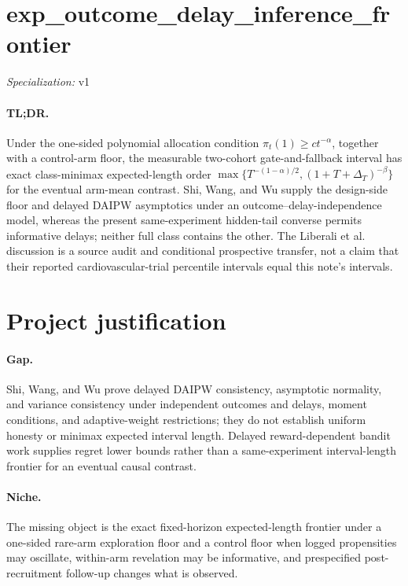 \documentclass{article}
\begin{document}
\sloppy

\section*{exp\_\allowbreak{}outcome\_\allowbreak{}delay\_\allowbreak{}inference\_\allowbreak{}frontier}

\noindent\textit{Specialization:} v1\par

\paragraph{TL;DR.} Under the one-sided polynomial allocation condition \(\pi_t(1)\geq ct^{-\alpha}\), together with a control-arm floor, the measurable two-cohort gate-and-fallback interval has exact class-minimax expected-length order \(\max\{T^{-(1-\alpha)/2},(1+T+\Delta_T)^{-\beta}\}\) for the eventual arm-mean contrast. Shi, Wang, and Wu supply the design-side floor and delayed DAIPW asymptotics under an outcome--delay-independence model, whereas the present same-experiment hidden-tail converse permits informative delays; neither full class contains the other. The Liberali et al. discussion is a source audit and conditional prospective transfer, not a claim that their reported cardiovascular-trial percentile intervals equal this note's intervals.

\section{Project justification}

\paragraph{Gap.} Shi, Wang, and Wu prove delayed DAIPW consistency, asymptotic normality, and variance consistency under independent outcomes and delays, moment conditions, and adaptive-weight restrictions; they do not establish uniform honesty or minimax expected interval length. Delayed reward-dependent bandit work supplies regret lower bounds rather than a same-experiment interval-length frontier for an eventual causal contrast.

\paragraph{Niche.} The missing object is the exact fixed-horizon expected-length frontier under a one-sided rare-arm exploration floor and a control floor when logged propensities may oscillate, within-arm revelation may be informative, and prespecified post-recruitment follow-up changes what is observed.
\end{document}
